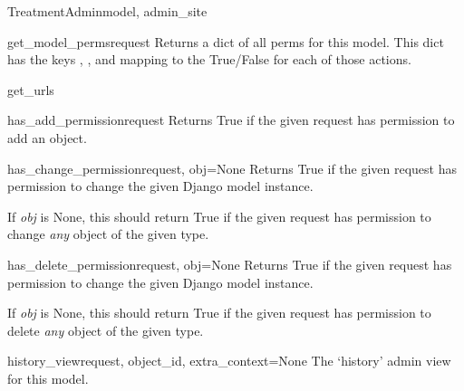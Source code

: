 \documentclass[letterpaper,10pt,english]{sphinxmanual}
\begin{document}
\begin{classdesc}{TreatmentAdmin}{model, admin\_site}
\hypertarget{data.admin.TreatmentAdmin.get_model_perms}{}\begin{methoddesc}{get\_model\_perms}{request}
Returns a dict of all perms for this model. This dict has the keys
, , and  mapping to the True/False for each
of those actions.
\end{methoddesc}

\hypertarget{data.admin.TreatmentAdmin.get_urls}{}\begin{methoddesc}{get\_urls}{}\end{methoddesc}

\hypertarget{data.admin.TreatmentAdmin.has_add_permission}{}\begin{methoddesc}{has\_add\_permission}{request}
Returns True if the given request has permission to add an object.
\end{methoddesc}

\hypertarget{data.admin.TreatmentAdmin.has_change_permission}{}\begin{methoddesc}{has\_change\_permission}{request, obj=None}
Returns True if the given request has permission to change the given
Django model instance.

If \emph{obj} is None, this should return True if the given request has
permission to change \emph{any} object of the given type.
\end{methoddesc}

\hypertarget{data.admin.TreatmentAdmin.has_delete_permission}{}\begin{methoddesc}{has\_delete\_permission}{request, obj=None}
Returns True if the given request has permission to change the given
Django model instance.

If \emph{obj} is None, this should return True if the given request has
permission to delete \emph{any} object of the given type.
\end{methoddesc}

\hypertarget{data.admin.TreatmentAdmin.history_view}{}\begin{methoddesc}{history\_view}{request, object\_id, extra\_context=None}
The `history' admin view for this model.
\end{methoddesc}


\end{classdesc}
\end{document}
